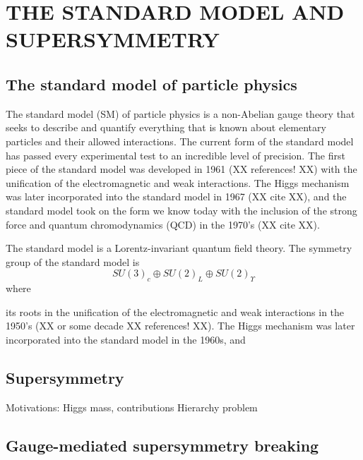 \chapter{THE STANDARD MODEL AND SUPERSYMMETRY}
\label{chap:theory}

\section{The standard model of particle physics}
\label{sec:StandardModel}
The standard model (SM) of particle physics is a non-Abelian gauge theory that seeks to describe and quantify everything that is known about elementary particles and their allowed interactions. The current form of the standard model has passed every experimental test to an incredible level of precision. The first piece of the standard model was developed in 1961 (XX references! XX) with the unification of the electromagnetic and weak interactions. The Higgs mechanism was later incorporated into the standard model in 1967 (XX cite XX), and the standard model took on the form we know today with the inclusion of the strong force and quantum chromodynamics (QCD) in the 1970's (XX cite XX).

The standard model is a Lorentz-invariant quantum field theory. The symmetry group of the standard model is 
\begin{equation}
SU(3)_c \oplus SU(2)_L \oplus SU(2)_\Upsilon
\end{equation}
where 

its roots in the unification of the electromagnetic and weak interactions in the 1950's (XX or some decade XX references! XX). The Higgs mechanism was later incorporated into the standard model in the 1960s, and 

\section{Supersymmetry}
\label{sec:SUSY}

Motivations:
Higgs mass, contributions 
Hierarchy problem 

\section{Gauge-mediated supersymmetry breaking}
\label{sec:gmsb}

